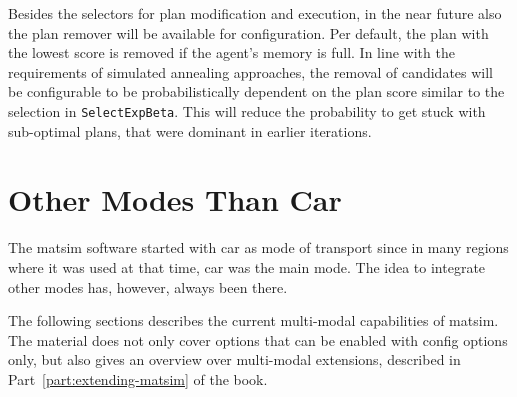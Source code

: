 Besides the selectors for plan modification and execution, in the near future also the plan remover will be available for configuration. Per default, the plan with the lowest score is removed if the agent's memory is full. In line with the requirements of \eg simulated annealing approaches, the removal of candidates will be configurable to be probabilistically dependent on the plan score similar to the selection in \lstinline|SelectExpBeta|. This will reduce the probability to get stuck with sub-optimal plans, that were dominant in earlier iterations.

\section{Other Modes Than Car}
\label{sec:using-othermodesthancar}




The \gls{matsim} software started with car as mode of transport since in many regions where it was used at that time, car was the main mode.  The idea to integrate other modes has, however, always been there.

The following sections describes the current multi-modal capabilities of \gls{matsim}.  The material does not only cover options that can be enabled with config options only, but also gives an overview over multi-modal extensions, described in Part~\ref{part:extending-matsim} of the book.

